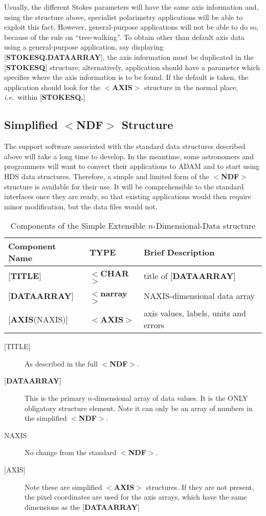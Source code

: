 \documentclass[twoside,11pt]{article}
\newcommand{\xlabel}[1]{}
\renewcommand{\_}{\texttt{\symbol{95}}}
\begin{document}
Usually, the different Stokes parameters will
have the same axis information and,
using the structure above, specialist polarimetry applications will
be able to exploit this fact.  However, general-purpose applications will
not be able to do so,
because of the rule on ``tree-walking''.  To obtain
other than default
axis data using a general-purpose application, say displaying
{[}{\bf STOKES\_Q.DATA\_ARRAY}{]}, the axis information
must be duplicated in the
{[}{\bf STOKES\_Q}{]} structure; alternatively,
application should have
a parameter which
specifies where the axis information is to be found.
If the default is taken, the application should look
for the $<${\bf AXIS}$>$ structure in
the normal place, {\it i.e.}\  within {[}{\bf STOKES\_Q.}{]}

\xlabel{se_sndf}\subsection{Simplified $<${\bf NDF}$>$ Structure\label{se:sndf}}

The support software associated with the
standard data structures described above
will take a long time to develop. In the meantime, some astronomers
and programmers will want to convert their applications to {\small ADAM} and
to start using HDS data structures.  Therefore, a simple and limited
form of the $<${\bf NDF}$>$ structure is available for their use.  It will be
comprehensible to the standard interfaces once they are ready, so
that existing
applications would then require minor modification, but the data files would
not.

\begin{table}[htb]
\centering
\caption{Components of the Simple Extensible $n$-Dimensional-Data structure}
\begin{tabular}{|l|l|l|}
\hline
Component Name & TYPE & Brief Description \\ \hline
{[}{\bf TITLE}{]} & $<${\bf \_CHAR}$>$ & title of {[}{\bf DATA\_ARRAY}{]} \\
{[}{\bf DATA\_ARRAY}{]} & $<${\bf narray}$>$ & NAXIS-dimensional data array \\
{[}{\bf AXIS}(NAXIS){]} & $<${\bf AXIS}$>$ & axis values, labels, units and errors \\ \hline
\end{tabular}
\end{table}

\begin{description}
\item [{[}TITLE{]}]  As described in the full $<${\bf NDF}$>$.
\item [{[}{\bf DATA\_ARRAY}{]}]  This is the primary
$n$-dimensional array of data values.
It is the ONLY obligatory structure element.  Note it can only be an array
of numbers in the simplified $<${\bf NDF}$>$.
\item [NAXIS]  No change from the standard $<${\bf NDF}$>$.
\item [{[}AXIS{]}] Note these are simplified $<${\bf AXIS}$>$ structures.
If they are not present, the pixel coordinates are used for the
axis arrays, which have the
same dimensions as the {[}{\bf DATA\_ARRAY}{]}
\end{description}
\end{document}

